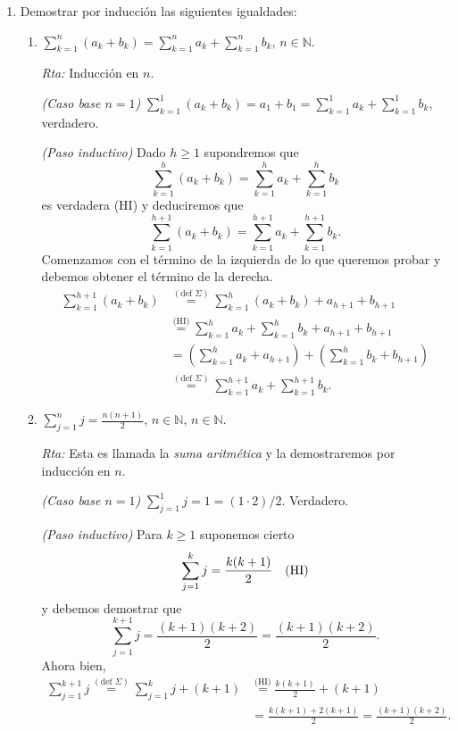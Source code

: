 \documentclass[12pt,spanish,makeidx]{amsbook}
\newcommand{\rta}{\noindent\textit{Rta: }}
\begin{document}
\begin{enumerate}
\begin{enumerate}
			
		\end{enumerate}
		\smallskip
		
		
		\item\label{ej-induccion} Demostrar por inducción  las siguientes igualdades:
		\begin{enumerate}
			\item  $\displaystyle{ \sum_{k=1}^n (a_k + b_k) = \sum_{k=1}^n a_k + \sum_{k=1}^n b_k}$, $n\in \mathbb N$.
			
			\rta Inducción en $n$.
			
			\textit{(Caso base $n=1$) }  $\sum_{k=1}^1 (a_k + b_k) = a_1+b_1 = \sum_{k=1}^1 a_k + \sum_{k=1}^1 b_k$, verdadero.
			
			\textit{(Paso inductivo) } Dado $h \ge 1$ supondremos  que 
			$$\sum_{k=1}^h (a_k + b_k) = \sum_{k=1}^h a_k + \sum_{k=1}^h b_k$$ es verdadera (HI) y deduciremos que $$\sum_{k=1}^{h+1} (a_k + b_k) = \sum_{k=1}^{h+1} a_k + \sum_{k=1}^{h+1} b_k.$$
			Comenzamos con el término de la izquierda de lo que queremos probar  y debemos obtener el término de la derecha. 
			\begin{align*}
				\sum_{k=1}^{h+1} (a_k + b_k) &\overset{(\text{def } \Sigma)}{=}  \sum_{k=1}^h (a_k + b_k) + a_{h+1} + b_{h+1}\\ &\overset{\text{(HI)}}{=} \sum_{k=1}^h a_k + \sum_{k=1}^h b_k + a_{h+1} + b_{h+1}
				\\&= ( \sum_{k=1}^h a_k+a_{h+1} ) + ( \sum_{k=1}^h b_k + b_{h+1}) \\&\overset{(\text{def } \Sigma)}{=} \sum_{k=1}^{h+1} a_k + \sum_{k=1}^{h+1} b_k.
			\end{align*}
			
			
			\item\label{ej-serie-aritmetica}  $\displaystyle{ \sum_{j=1}^n j = \frac{n(n+1)}{2}}$, $n\in \mathbb N$, $n\in \mathbb N$.
			
			\rta Esta es llamada la \textit{suma aritmética} y la demostraremos por inducción en $n$.
			
			\textit{(Caso base $n=1$) } $ \sum_{j=1}^1 j = 1 = (1 \cdot 2)/2$. Verdadero. 
			
			\textit{(Paso inductivo) } Para $k \ge 1$ suponemos cierto $$\sum_{j=1}^k j = \frac{k(k+1)}{2} \text{\quad (HI)}$$  y  debemos demostrar  que $$\sum_{j=1}^{k+1} j = \frac{(k+1)(k+2)}{2} = \frac{(k+1)(k+2)}{2}.$$ Ahora bien,
			\begin{align*}
				\sum_{j=1}^{k+1} j \overset{(\text{def } \Sigma)}{=} \sum_{j=1}^k j + (k+1)&  \overset{\text{(HI)}}{=} \frac{k(k+1)}{2} + (k+1) \\&= \frac{k(k+1) +2(k+1)}{2} = \frac{(k+1)(k +2)}{2}. 
			\end{align*}
			

\end{enumerate}
\end{enumerate}
\end{document}
